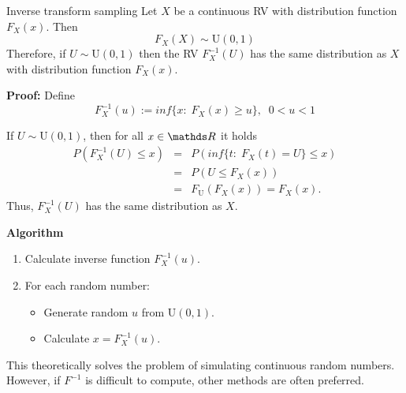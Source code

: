 
\begin{vbframe}{Inverse transform sampling}
Let $X$ be a continuous RV with distribution function $F_X(x)$. Then
$$
F_X(X) \sim \text{U}(0, 1)
$$
Therefore, if $U \sim \text{U}(0, 1)$ then the RV $F_X^{-1}(U)$ has the same distribution as $X$ with distribution function $F_X(x)$.

\lz
\begin{footnotesize}
\textbf{Proof:}
Define
$$
F_X^{-1}(u):= inf\{x: \; F_X(x) \geq u\}, \; \; 0<u<1
$$

\lz

If $U \sim \text{U}(0, 1)$, then for all $x \in \R$ it holds 
\begin{eqnarray*}
P(F_X^{-1}(U) \leq x) &=& P(inf\{t: \; F_X(t)=U\} \leq x) \\
&=&P(U \leq F_X(x)) \\
&=&F_\text{U}(F_X(x))=F_X(x).
\end{eqnarray*}
\lz
Thus, $F_X^{-1}(U)$ has the same distribution as $X$.
\end{footnotesize}
\framebreak

\textbf{Algorithm}

\begin{enumerate}
\item Calculate inverse function $F_X^{-1}(u)$.
\item For each random number:
\begin{itemize}
\item Generate random $u$ from $\text{U}(0,1)$.
\item Calculate $x=F_X^{-1}(u)$.
\end{itemize}
\end{enumerate}

\lz

This theoretically solves the problem of simulating continuous random numbers. However, if $F^{-1}$ is difficult to compute, other methods are often preferred.
\end{vbframe}

